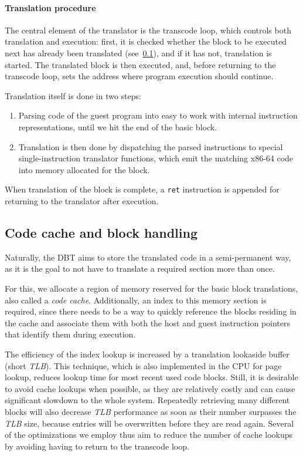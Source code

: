 \paragraph{Translation procedure} \mbox{}

The central element of the translator is the transcode loop, which controls both translation and execution:
first, it is checked whether the block to be executed next has already been translated (see~\ref{sec:code-cache}), and if it has not, translation is started.
The translated block is then executed, and, before returning to the transcode loop, sets the address where program execution should continue.

Translation itself is done in two steps:
\begin{enumerate}
	\item Parsing code of the guest program into easy to work with internal instruction representations, until we hit the end of the basic block.
	\item Translation is then done by dispatching the parsed instructions to special single-instruction translator functions, which emit the matching x86-64 code into memory allocated for the block.
\end{enumerate}

When translation of the block is complete, a \texttt{ret} instruction is appended for returning to the translator after execution.


\subsection{Code cache and block handling}
\label{sec:code-cache}
Naturally, the DBT aims to store the translated code in a semi-permanent way, as it is the goal to not have to translate a required section more than once.

For this, we allocate a region of memory reserved for the basic block translations, also called a \textit{code cache}.
Additionally, an index to this memory section is required, since there needs to be a way to quickly reference the blocks residing in the cache and associate them with both the host and guest instruction pointers that identify them during execution.

The efficiency of the index lookup is increased by a translation lookaside buffer (short \textit{TLB}).
This technique, which is also implemented in the CPU for page lookup, reduces lookup time for most recent used code blocks. %
Still, it is desirable to avoid cache lookups when possible, as they are relatively costly and can cause significant slowdown to the whole system. 
Repeatedly retrieving many different blocks will also decrease \textit{TLB} performance as soon as their number surpasses the \textit{TLB} size, because entries will be overwritten before they are read again. %
Several of the optimizations we employ thus aim to reduce the number of cache lookups by avoiding having to return to the transcode loop.

